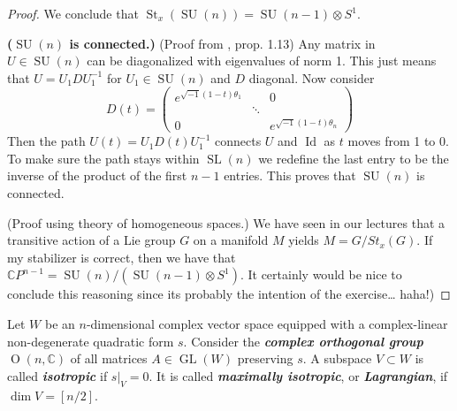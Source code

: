 \documentclass{article}
\newcommand{\C}{\mathbb{C}}
\renewcommand{\O}{\operatorname{O}}
\DeclareMathOperator{\Id}{Id}
\DeclareMathOperator{\GL}{GL}
\DeclareMathOperator{\SL}{SL}
\DeclareMathOperator{\SU}{SU}
\DeclareMathOperator{\St}{St}
\begin{document}
\begin{proof}
	We conclude that $\St_x(\SU(n))=\SU(n-1)\otimes S^1$.
	
	\textbf{($\SU(n)$ is connected.)} (Proof from \cite{hall}, prop. 1.13) Any matrix in $U\in\SU(n)$ can be diagonalized with eigenvalues of norm 1. This just means that $U=U_1DU_1^{-1}$ for $U_1\in\SU(n)$ and $D$ diagonal. Now consider
	\[D(t)=\begin{pmatrix}
		e^{\sqrt{-1}(1-t)\theta_1}&&0\\
		&\ddots&\\
		0&&e^{\sqrt{-1}(1-t)\theta_n}
	\end{pmatrix}\]
	Then the path $U(t)=U_1D(t)U_1^{-1}$ connects $U$ and $\Id$ as $t$ moves from 1 to 0. To make sure the path stays within $\SL(n)$ we redefine the last entry to be the inverse of the product of the first $n-1$ entries. This proves that $\SU(n)$ is connected.
	
 	(Proof using theory of homogeneous spaces.) We have seen in our lectures that a transitive action of a Lie group $G$ on a manifold $M$ yields $M=G/St_x(G)$. If my stabilizer is correct, then we have that $\C P^{n-1}=\SU(n)/(\SU(n-1)\otimes S^1)$. {\color{red}It certainly would be nice to conclude this reasoning since its probably the intention of the exercise… haha!)}
	
	\iffalse In fact, there is a fiber bundle associated to the action on $S^{2n-1}$:
	\[\begin{tikzcd}
		\SU(n-1)\arrow[r,hook]&\SU(n)\arrow[r]&S^{2n-1}
	\end{tikzcd}\]
	
	\begin{remark}
		Such a fiber bundle is of the form
		\[\begin{tikzcd}
			\text{stabilizer}\arrow[r,hook]&\SU(n)\arrow[r]&\text{orbit}.
		\end{tikzcd}\]
		I have found a proof that this is in fact a fiber bundle in \cite{hall}, prop. 13.8, stated as follows. If $G$ is a matrix Lie group and $H$ is a closed subgroup, then $G$ has the structure of a fiber bundle with base $G/H$ and fiber $H$. See also prop. 13.11 for the case $\SU(n)$.
	\end{remark}
	\fi
\end{proof}

\begin{defn}
	Let $W$ be an $n$-dimensional complex vector space equipped with a complex-linear non-degenerate quadratic form $s$. Consider the \textbf{\textit{complex orthogonal group}} $\O(n,\C)$ of all matrices $A \in \GL(W )$ preserving $s$. A subspace $V \subset W$ is called \textbf{\textit{isotropic}} if $s|_V = 0$. It is called \textbf{\textit{maximally isotropic}}, or \textbf{\textit{Lagrangian}}, if $\dim V = [n/2]$.
\end{defn}
\end{document}
